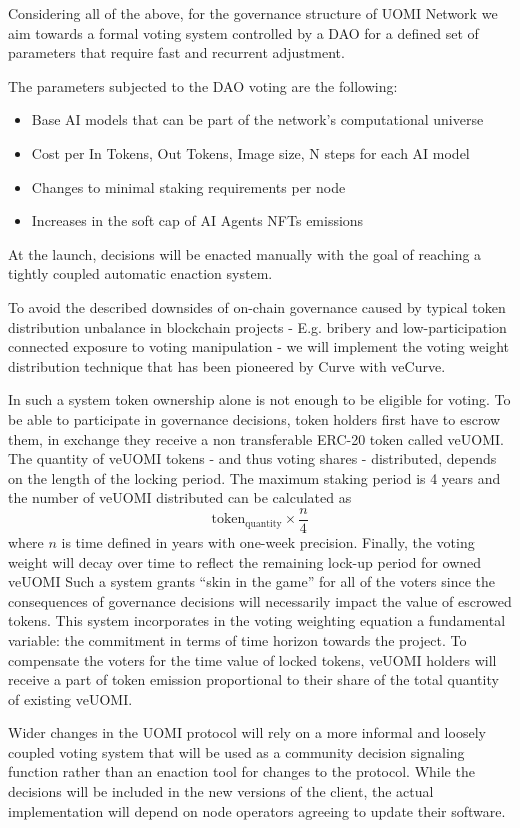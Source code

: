 \documentclass{article}
\begin{document}
Considering all of the above, for the governance structure of UOMI Network we aim towards a formal voting system controlled by a DAO for a defined set of parameters that require fast and recurrent adjustment.

The parameters subjected to the DAO voting are the following:

\begin{itemize}

\item Base AI models that can be part of the network's computational universe
\item Cost per In Tokens, Out Tokens,  Image size, N steps for each AI model
\item Changes to minimal staking requirements per node
\item Increases in the soft cap of AI Agents NFTs emissions

\end{itemize}

At the launch, decisions will be enacted manually with the goal of reaching a tightly coupled automatic enaction system.

To avoid the described downsides of on-chain governance caused by typical token distribution unbalance in blockchain projects - E.g. bribery and low-participation connected exposure to voting manipulation - we will implement the voting weight distribution technique that has been pioneered by Curve with veCurve. 

In such a system token ownership alone is not enough to be eligible for voting. To be able to participate in governance decisions, token holders first have to escrow them, in exchange they receive a non transferable ERC-20 token called veUOMI. The quantity of veUOMI tokens - and thus voting shares - distributed, depends on the length of the locking period. The maximum staking period is 4 years and the number of veUOMI distributed can be calculated as \[
\text{token}_{\scriptstyle\text{quantity}} \times \frac{n}{4}
\]  where \(n\)  is time defined in years with one-week precision. Finally, the voting weight will decay over time to reflect the remaining lock-up period for owned veUOMI Such a system grants “skin in the game” for all of the voters since the consequences of governance decisions will necessarily impact the value of escrowed tokens. This system incorporates in the voting weighting equation a fundamental variable: the commitment in terms of time horizon towards the project. To compensate the voters for the time value of locked tokens, veUOMI holders will receive a part of token emission proportional to their share of the total quantity of existing veUOMI. 

Wider changes in the UOMI protocol will rely on a more informal and loosely coupled voting system that will be used as a community decision signaling function rather than an enaction tool for changes to the protocol. While the decisions will be included in the new versions of the client, the actual implementation will depend on node operators agreeing to update their software.
\end{document}
